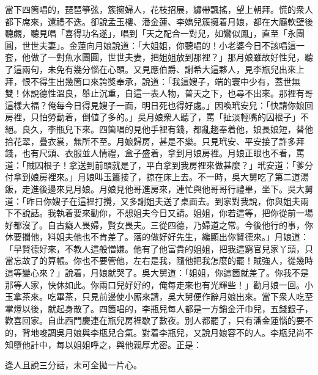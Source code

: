 當下四箇唱的，琵琶箏弦，簇擁婦人，花枝招展，繡帶飄搖，望上朝拜。慌的衆人都下席來，還禮不迭。卻說孟玉樓、潘金蓮、李嬌兒簇擁着月娘，都在大廳軟壁後聽覷，聽見唱「喜得功名遂」，唱到「天之配合一對兒，如鸞似鳳」，直至「永團圓，世世夫妻」。金蓮向月娘說道：「大姐姐，你聽唱的！小老婆今日不該唱這一套，{}他做了一對魚水團圓，世世夫妻，把姐姐放到那裡？」{}那月娘雖故好性兒，聽了這兩句，未免有幾分惱在心頭。又見應伯爵、謝希大這夥人，見李瓶兒出來上拜，恨不得生出幾箇口來誇獎奉承，說道：「我這嫂子，端的寰中少有，蓋世無雙！休說德性溫良，舉止沉重，自這一表人物，普天之下，也尋不出來。那裡有哥這樣大福？俺每今日得見嫂子一面，明日死也得好處。」{}因喚玳安兒：「快請你娘回房裡，只怕勞動着，倒値了多的。」吳月娘衆人聽了，罵「扯淡輕嘴的囚根子」不絕。良久，李瓶兒下來。四箇唱的見他手裡有錢，都亂趨奉着他，娘長娘短，替他拾花翠，疊衣裳，無所不至。月娘歸房，甚是不樂。只見玳安、平安接了許多拜錢，也有尺頭、衣服並人情禮，盒子盛着，拿到月娘房裡。月娘正眼也不看，罵道：「賊囚根子！拿送到前頭就是了，平白拿到我房裡來做甚麼？」玳安道：「爹分付拿到娘房裡來。」{}月娘叫玉簫接了，掠在床上去。不一時，吳大舅吃了第二道湯飯，走進後邊來見月娘。月娘見他哥進房來，連忙與他哥哥行禮畢，坐下。吳大舅道：「昨日你嫂子在這裡打攪，又多謝姐夫送了桌面去。到家對我說，你與姐夫兩下不說話。我執着要來勸你，不想姐夫今日又請。姐姐，你若這等，把你從前一場好都沒了。自古癡人畏婦，賢女畏夫。三從四德，乃婦道之常。今後他行的事，你休要攔他，料姐夫他也不肯差了。落的做好好先生，纔顯出你賢德來。」{}月娘道：「早賢德好來，不教人這般憎嫌。他有了他富貴的姐姐，把我這窮官兒家丫頭，只當忘故了的算帳。你也不要管他，左右是我，隨他把我怎麼的罷！賊強人，從幾時這等變心來？」說着，月娘就哭了。吳大舅道：「姐姐，你這箇就差了。你我不是那等人家，快休如此。你兩口兒好好的，俺每走來也有光輝些！」{}勸月娘一回。小玉拿茶來。吃畢茶，只見前邊使小厮來請，吳大舅便作辭月娘出來。當下衆人吃至掌燈以後，就起身散了。四箇唱的，李瓶兒每人都是一方銷金汗巾兒，五錢銀子，歡喜回家。自此西門慶連在瓶兒房裡歇了數夜。別人都罷了，只有潘金蓮惱的要不的，背地唆調吳月娘與李瓶兒合氣。對着李瓶兒，又說月娘容不的人。李瓶兒尚不知墮他計中，每以姐姐呼之，與他親厚尤密。正是：

\begin{myquote} 
逢人且說三分話，未可全拋一片心。
\end{myquote} 

